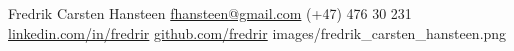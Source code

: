 \cvheader
  {Fredrik Carsten Hansteen}
  {\faEnvelope\enspace\href{mailto:fhansteen@gmail.com}{fhansteen@gmail.com}\cvcontactsep
   \faPhone\enspace(+47) 476 30 231\cvcontactsep
   \faLinkedinIn\enspace\href{https://www.linkedin.com/in/fredrir}{linkedin.com/in/fredrir}\cvcontactsep
   \faGithub\enspace\href{https://github.com/fredrir}{github.com/fredrir}}
  {images/fredrik_carsten_hansteen.png}
